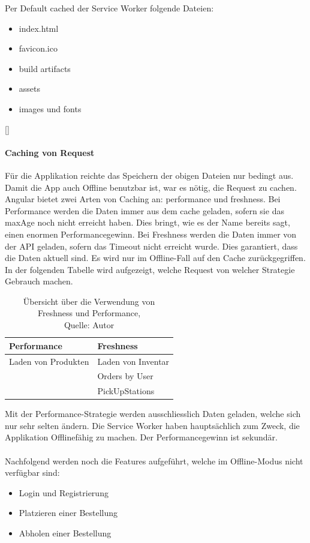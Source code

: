 Per Default cached der Service Worker folgende Dateien: 
\begin{itemize}
	\item index.html
	\item favicon.ico
	\item build artifacts
	\item assets 
	\item images und fonts
\end{itemize} [\cite{serviceWorker}]
\newpage
\paragraph{Caching von Request}
Für die Applikation reichte das Speichern der obigen Dateien nur bedingt aus. Damit die App auch Offline benutzbar ist, war es nötig, die Request zu cachen. Angular bietet zwei Arten von Caching an: performance und freshness. Bei Performance werden die Daten immer aus dem cache geladen, sofern sie das maxAge noch nicht erreicht haben. Dies bringt, wie es der Name bereits sagt, einen enormen Performancegewinn. Bei Freshness werden die Daten immer von der API geladen, sofern das Timeout nicht erreicht wurde. Dies garantiert, dass die Daten aktuell sind. Es wird nur im Offline-Fall auf den Cache zurückgegriffen. \\
In der folgenden Tabelle wird aufgezeigt, welche Request von welcher Strategie Gebrauch machen. 

\begin{table}[H]
	\setlength\extrarowheight{2pt} %
	\begin{tabularx}{\textwidth}{|X|l|}
		\hline
		\textbf{Performance} & \textbf{Freshness} \\
		\hline
		Laden von Produkten& Laden von Inventar\\
		\hline
		& Orders by User\\
		\hline
		& PickUpStations\\
		\hline
	\end{tabularx} 
	\caption[Übersicht über die Verwendung von Freshness und Performance]{Übersicht über die Verwendung von Freshness und Performance,\\ Quelle: Autor}
\end{table}\label{performanceFreshness}
Mit der Performance-Strategie werden ausschliesslich Daten geladen, welche sich nur sehr selten ändern. Die Service Worker haben hauptsächlich zum Zweck, die Applikation Offlinefähig zu machen. Der Performancegewinn ist sekundär. \\\\
Nachfolgend werden noch die Features aufgeführt, welche im Offline-Modus nicht verfügbar sind: 
\begin{itemize}
	\item Login und Registrierung
	\item Platzieren einer Bestellung
	\item Abholen einer Bestellung
\end{itemize}

